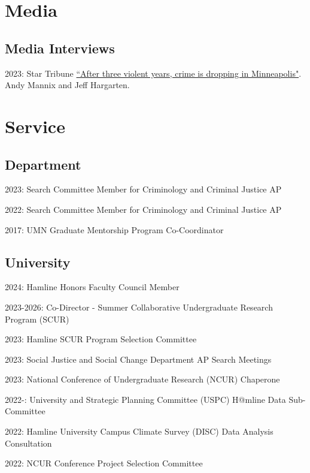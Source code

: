 \documentclass[letterpaper]{article}
\renewenvironment{itemize}{
  \begin{list}{}{
    \setlength{\leftmargin}{1.5em}
  }
}{
  \end{list}
}
\begin{document}
\section*{\textbf{Media}}

\subsection*{Media Interviews}
\begin{itemize}

\item 2023: Star Tribune \href{https://www.startribune.com/after-three-most-violent-years-minneapolis-saw-drop-in-crime-summer-but-were-not-back-to-normal-yet/600301635/}{``After three violent years, crime is dropping in Minneapolis"}. Andy Mannix and Jeff Hargarten.  

\end{itemize}

\section*{\textbf{Service}}

\subsection*{Department}
\begin{itemize}

\item 2023: Search Committee Member for Criminology and Criminal Justice AP
\item 2022: Search Committee Member for Criminology and Criminal Justice AP
\item 2017: UMN Graduate Mentorship Program Co-Coordinator

\end{itemize}

\subsection*{University}
\begin{itemize}
\item 2024: Hamline Honors Faculty Council Member
\item 2023-2026: Co-Director - Summer Collaborative Undergraduate Research Program (SCUR)
\item 2023: Hamline SCUR Program Selection Committee
\item 2023: Social Justice and Social Change Department AP Search Meetings
\item 2023: National Conference of Undergraduate Research (NCUR) Chaperone
\item 2022-: University and Strategic Planning Committee (USPC) H@mline Data Sub-Committee
\item 2022: Hamline University Campus Climate Survey (DISC) Data Analysis Consultation
\item 2022: NCUR Conference Project Selection Committee
\end{itemize}
\end{document}
